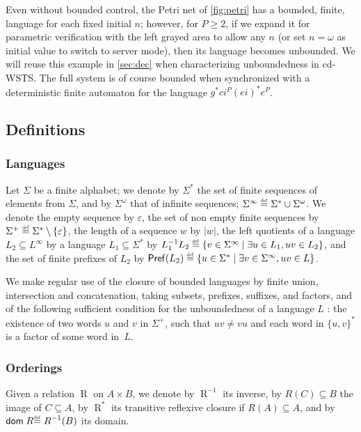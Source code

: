 \documentclass[11pt,reqno,a4paper]{amsart}
\newcommand{\eqdef}{\stackrel{\raisebox{-.15ex}{\scalebox{.5}{\upshape\textrm{def}}}}{=}}
\newcommand{\prefix}[1]{\mathsf{Pref}(#1)}
\theoremstyle{plain}
\theoremstyle{definition}
\theoremstyle{remark}
\renewcommand{\paragraph}{\subsubsection*}
\begin{document}
Even without bounded control, the Petri net of
\autoref{fig:petri} has a bounded, finite, language for each
fixed initial $n$; however, for $P\geq 2$, if we expand it for parametric
verification with the left grayed area to allow any $n$ (or set $n=\omega$
as initial value to switch to server mode), then its language becomes
unbounded.  We will reuse this example in \autoref{sec:dec} when
characterizing unboundedness in cd-WSTS.  The full system is of course
bounded when synchronized with a deterministic finite automaton for
the language $g^\ast ci^P(ei)^\ast e^P$.

 
\subsection{Definitions}


\paragraph{Languages}
Let $\Sigma$ be a finite alphabet; we denote by $\Sigma^\ast$ the set
of finite sequences of elements from $\Sigma$, and by $\Sigma^\omega$
that of infinite sequences;
$\Sigma^\infty\eqdef\Sigma^\ast\cup\Sigma^\omega$.  We denote the
empty sequence by $\varepsilon$, the set of non empty finite sequences
by $\Sigma^+\eqdef\Sigma^\ast\setminus\{\varepsilon\}$, the length of
a sequence $w$ by $|w|$, the left quotients of a language
$L_2\subseteq L^\infty$ by a language $L_1\subseteq\Sigma^\ast$ by
$L_1^{-1}L_2\eqdef\{v\in\Sigma^\infty\mid\exists u\in L_1,uv\in
L_2\}$, and the set of finite prefixes of $L_2$ by
$\prefix{L_2}\eqdef\{u\in\Sigma^\ast\mid\exists
v\in\Sigma^\infty,uv\in L\}$.

We make regular use of the closure of bounded languages by finite
union, intersection and concatenation, taking subsets, prefixes,
suffixes, and factors, and of the following sufficient condition for the
unboundedness of a language $L$ \citep[Lemma~5.3]{bcfl}: the existence
of two words $u$ and $v$ in $\Sigma^+$, such that $uv\neq vu$ and each
word in $\{u,v\}^\ast$ is a factor of some word in~$L$.

\paragraph{Orderings}
Given a relation $\mathrel{R}$ on $A\times B$, we denote by
$\mathrel{R}^{-1}$ its inverse, by $\mathbin{R}(C)\subseteq B$ the
image of $C\subseteq A$, by $\mathbin{R}^\ast$ its transitive reflexive
closure if $\mathbin{R}(A)\subseteq A$, and by
$\mathop{\mathsf{dom}}\mathrel{R}\eqdef{\mathbin{R}}^{-1}(B)$ its
domain.
\end{document}

